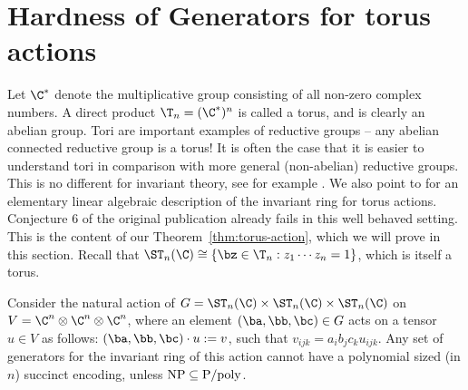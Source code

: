 \setcounter{theorem}{19}
\section{Hardness of Generators for torus actions}\label{sec:torus}

Let $\C^*$ denote the multiplicative group consisting of all non-zero
complex numbers. A direct product $\T_n = (\C^*)^n$ is called a torus, and
is clearly an abelian group. Tori are important examples of reductive
groups -- any abelian connected reductive group is a torus! It is often the case that it is easier to understand tori in comparison with more general (non-abelian) reductive groups. This is no different for invariant theory, see for example \cite{DK,Wehlau}. We also point to \cite[Proposition~3.3]{DM-exp} for an elementary linear algebraic description of the invariant ring for torus actions. Conjecture 6 of the original publication already fails in this well behaved setting.
This is the content of our Theorem~\ref{thm:torus-action}, which we will prove in this section.
Recall that $\ST_n(\C) \cong \{ \bz \in \T_n : z_1\cdots z_n = 1 \}$, which is itself a torus.

\begin{theorem}
	Consider the natural action of $G = \ST_n(\C) \times \ST_n(\C) \times \ST_n(\C)$
	on $V = \C^n \otimes \C^n \otimes \C^n$, where an element
	$(\ba, \bb, \bc) \in G$ acts on a tensor $u \in V$ as follows:
  $(\ba,\bb,\bc) \cdot u := v$, such that
	$v_{ijk} = a_i b_j c_k u_{ijk}$. Any set of generators
	for the invariant ring of this action cannot have a polynomial sized
	(in $n$) succinct encoding, unless ${\rm NP \subseteq P/poly}$.
\end{theorem}

